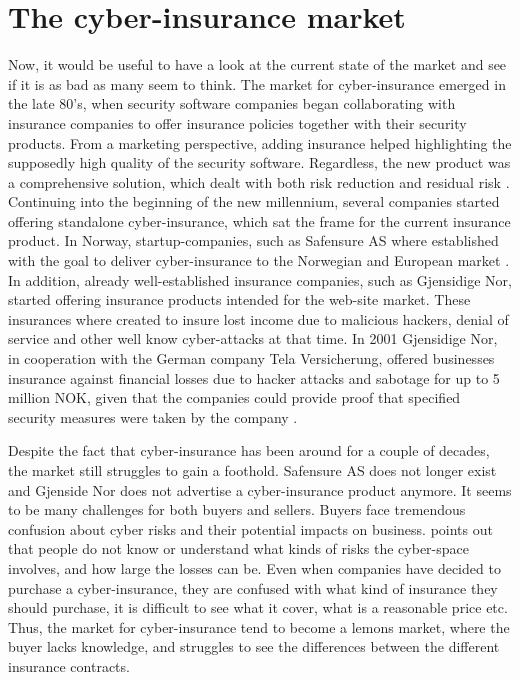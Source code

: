 \section{The cyber-insurance market}

Now, it would be useful to have a look at the current state of the market and see if it is as bad as many seem to think.
The market for cyber-insurance emerged in the late 80's, when security software companies began collaborating with insurance companies to offer insurance policies together with their security products. From a marketing perspective, adding insurance helped highlighting the supposedly high quality of the security software. Regardless, the new product was a comprehensive solution, which dealt with both risk reduction and residual risk \cite{bolot2008new}. Continuing into the beginning of the new millennium, several companies started offering standalone cyber-insurance, which sat the frame for the current insurance product. In Norway, startup-companies, such as Safensure AS where established with the goal to deliver cyber-insurance to the Norwegian and European market \cite{digi}. In addition, already well-established insurance companies, such as Gjensidige Nor, started offering insurance products intended for the web-site market. These insurances where created to insure lost income due to malicious hackers, denial of service and other well know cyber-attacks at that time. In 2001 Gjensidige Nor, in cooperation with the German company Tela Versicherung, offered businesses insurance against financial losses due to hacker attacks and sabotage for up to 5 million NOK, given that the companies could provide proof that specified security measures were taken by the company \cite{dagensithackerforsikring}. 
 

Despite the fact that cyber-insurance has been around for a couple of decades, the market still struggles to gain a foothold. Safensure AS does not longer exist and Gjenside Nor does not advertise a cyber-insurance product anymore. It seems to be many challenges for both buyers and sellers. Buyers face tremendous confusion about cyber risks and their potential impacts on business. 
\cite{Cyberworkshop} points out that people do not know or understand what kinds of risks the cyber-space involves, and how large the losses can be. Even when companies have decided to purchase a cyber-insurance, they are confused with what kind of insurance they should purchase, it is difficult to see what it cover, what is a reasonable price etc. Thus, the market for cyber-insurance tend to become a lemons market, where the buyer lacks knowledge, and struggles to see the differences between the different insurance contracts.


